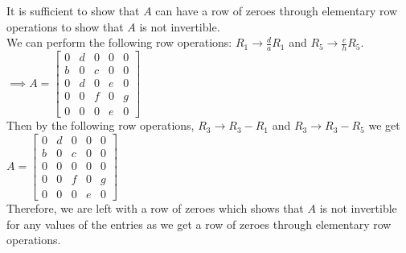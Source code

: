 \documentclass[addpoints]{exam}
\begin{document}
\begin{questions}
    \begin{solution}
        It is sufficient to show that $A$ can have a row of zeroes through elementary row operations to show that $A$ is not invertible. \\ 
        We can perform the following row operations: $ R_1 \rightarrow \frac{d}{a}R_1 $ and $ R_5 \rightarrow \frac{e}{h}R_5 $. \\ 
        $ \implies A = \begin{bmatrix}
        0 & d & 0 & 0 & 0 \\ b & 0 & c & 0 & 0 \\ 0 & d & 0 & e & 0 \\ 0 & 0 & f & 0 & g \\ 0 & 0 & 0 & e & 0
    \end{bmatrix} $ \\ 
    Then by the following row operations, $ R_3 \rightarrow R_3 - R_1 $ and $ R_3 \rightarrow R_3 - R_5 $ we get \\ 
    $ A = \begin{bmatrix}
        0 & d & 0 & 0 & 0 \\ b & 0 & c & 0 & 0 \\ 0 & 0 & 0 & 0 & 0 \\ 0 & 0 & f & 0 & g \\ 0 & 0 & 0 & e & 0
    \end{bmatrix} $ \\ 
    Therefore, we are left with a row of zeroes which shows that $A$ is not invertible for any values of the entries as we get a row of zeroes through elementary row operations.

    \end{solution}

\end{questions}
\end{document}
